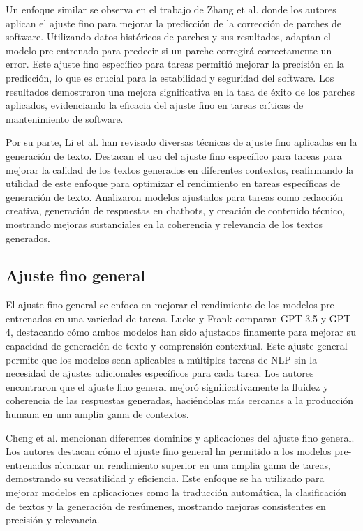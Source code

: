 Un enfoque similar se observa en el trabajo de Zhang et al. \cite{Zhang2024} donde los autores aplican el ajuste fino para mejorar la predicción de la corrección de parches de software. Utilizando datos históricos de parches y sus resultados, adaptan el modelo pre-entrenado para predecir si un parche corregirá correctamente un error. Este ajuste fino específico para tareas permitió mejorar la precisión en la predicción, lo que es crucial para la estabilidad y seguridad del software. Los resultados demostraron una mejora significativa en la tasa de éxito de los parches aplicados, evidenciando la eficacia del ajuste fino en tareas críticas de mantenimiento de software.

Por su parte, Li et al. \cite{JunyiLi2024} han revisado diversas técnicas de ajuste fino aplicadas en la generación de texto. Destacan el uso del ajuste fino específico para tareas para mejorar la calidad de los textos generados en diferentes contextos, reafirmando la utilidad de este enfoque para optimizar el rendimiento en tareas específicas de generación de texto. Analizaron modelos ajustados para tareas como redacción creativa, generación de respuestas en chatbots, y creación de contenido técnico, mostrando mejoras sustanciales en la coherencia y relevancia de los textos generados.

\subsection{Ajuste fino general}

El ajuste fino general se enfoca en mejorar el rendimiento de los modelos pre-entrenados en una variedad de tareas. Lucke y Frank \cite{Lucke2024} comparan GPT-3.5 y GPT-4, destacando cómo ambos modelos han sido ajustados finamente para mejorar su capacidad de generación de texto y comprensión contextual. Este ajuste general permite que los modelos sean aplicables a múltiples tareas de NLP sin la necesidad de ajustes adicionales específicos para cada tarea. Los autores encontraron que el ajuste fino general mejoró significativamente la fluidez y coherencia de las respuestas generadas, haciéndolas más cercanas a la producción humana en una amplia gama de contextos.

Cheng et al. \cite{Cheng2023} mencionan diferentes dominios y aplicaciones del ajuste fino general. Los autores destacan cómo el ajuste fino general ha permitido a los modelos pre-entrenados alcanzar un rendimiento superior en una amplia gama de tareas, demostrando su versatilidad y eficiencia. Este enfoque se ha utilizado para mejorar modelos en aplicaciones como la traducción automática, la clasificación de textos y la generación de resúmenes, mostrando mejoras consistentes en precisión y relevancia.

